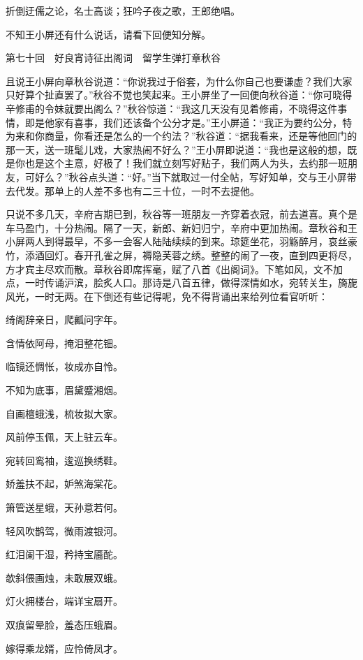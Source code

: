\documentclass[12pt,UTF8]{ctexbook}
\begin{document}
{{{折倒迂儒之论，名士高谈；狂吟子夜之歌，王郎绝唱。

不知王小屏还有什么说话，请看下回便知分解。





第七十回　好良宵诗征出阁词　留学生弹打章秋谷





且说王小屏向章秋谷说道：“你说我过于俗套，为什么你自己也要谦虚？我们大家只好算个扯直罢了。”秋谷不觉也笑起来。王小屏坐了一回便向秋谷道：“你可晓得辛修甫的令妹就要出阁么？”秋谷惊道：“我这几天没有见着修甫，不晓得这件事情，即是他家有喜事，我们还该备个公分才是。”王小屏道：“我正为要约公分，特为来和你商量，你看还是怎么的一个约法？”秋谷道：“据我看来，还是等他回门的那一天，送一班髦儿戏，大家热闹不好么？”王小屏即说道：“我也是这般的想，既是你也是这个主意，好极了！我们就立刻写好贴子，我们两人为头，去约那一班朋友，可好么？”秋谷点头道：“好。”当下就取过一付全帖，写好知单，交与王小屏带去代发。那单上的人差不多也有二三十位，一时不去提他。

只说不多几天，辛府吉期已到，秋谷等一班朋友一齐穿着衣冠，前去道喜。真个是车马盈门，十分热闹。隔了一天，新郎、新妇归宁，辛府中更加热闹。章秋谷和王小屏两人到得最早，不多一会客人陆陆续续的到来。琼筵坐花，羽觞醉月，哀丝豪竹，添酒回灯。春开孔雀之屏，褥隐芙蓉之绣。整整的闹了一夜，直到四更将尽，方才宾主尽欢而散。章秋谷即席挥毫，赋了八首《出阁词》。下笔如风，文不加点，一时传诵沪滨，脍炙人口。那诗是八首五律，做得深情如水，宛转关生，旖旎风光，一时无两。在下倒还有些记得呢，免不得背诵出来给列位看官听听：

绮阁辞亲日，爬瓤问字年。

含情依阿母，掩泪整花钿。

临镜还惆怅，妆成亦自怜。

不知为底事，眉黛蹙湘烟。

自画檀蛾浅，梳妆拟大家。

风前停玉佩，天上驻云车。

宛转回鸾袖，逡巡换绣鞋。

娇羞扶不起，妒煞海棠花。

箫管送星蛾，天孙意若何。

轻风吹鹊驾，微雨渡银河。

红泪阑干湿，矜持宝靥酡。

欹斜偎画烛，未敢展双蛾。

灯火拥楼台，端详宝扇开。

双痕留晕脸，羞态压蛾眉。

嫁得乘龙婿，应怜倚凤才。

}}}
\end{document}
